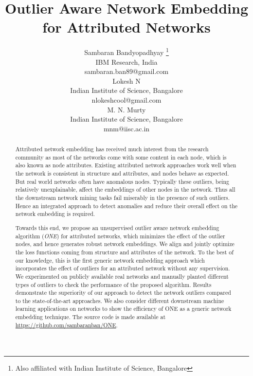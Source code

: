 \documentclass[letterpaper]{article} %
\begin{document}
\title{Outlier Aware Network Embedding for Attributed Networks}

\author{Sambaran Bandyopadhyay \thanks{Also affiliated with Indian Institute of Science, Bangalore}\\
IBM Research, India\\
sambaran.ban89@gmail.com \\
 \And Lokesh N \\ Indian Institute of Science, Bangalore \\ nlokeshcool@gmail.com\\
 \And M. N. Murty \\ Indian Institute of Science, Bangalore \\ mnm@iisc.ac.in}

\maketitle

\begin{abstract}
Attributed network embedding has received much interest from the research community as most of the networks come with some content in each node, which is also known as node attributes. Existing attributed network approaches work well when the network is consistent in structure and attributes, and nodes behave as expected. But real world networks often have anomalous nodes. Typically these outliers, being relatively unexplainable, affect the embeddings of other nodes in the network. Thus all the downstream network mining tasks fail miserably in the presence of such outliers. Hence an integrated approach to detect anomalies and reduce their overall effect on the network embedding is required.

Towards this end, we propose an unsupervised outlier aware network embedding algorithm (\textit{ONE}) for attributed networks, which minimizes the effect of the outlier nodes, and hence generates robust network embeddings. We align and jointly optimize the loss functions coming from structure and attributes of the network. To the best of our knowledge, this is the first generic network embedding approach which incorporates the effect of outliers for an attributed network without any supervision. We experimented on publicly available real networks and manually planted different types of outliers to check the performance of the proposed algorithm. Results demonstrate the superiority of our approach to detect the network outliers compared to the state-of-the-art approaches. We also consider different downstream machine learning applications on networks to show the efficiency of ONE as a generic network embedding technique. The source code is made available at \url{https://github.com/sambaranban/ONE}.
\end{abstract}
\end{document}
